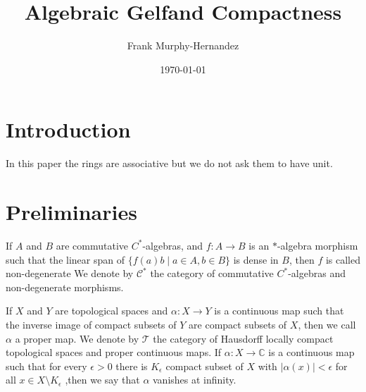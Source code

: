 \documentclass{amsart}
\begin{document}
\title{Algebraic Gelfand Compactness}

\author{Frank Murphy-Hernandez}
\address{Facultad de Ciencias, UNAM, Mexico City}


\date{\today}

\keywords{,,}

\begin{abstract}

\end{abstract}

\maketitle

\section*{Introduction}

In this paper the rings are associative but we do not ask them to have unit.



\section{Preliminaries}

\cite{wisbauer2018foundations}

If $A$ and $B$ are commutative $C^*$-algebras, and $f\colon A\longrightarrow B$ is an $*$-algebra morphism such that the linear span of $\{f(a)b\mid a\in A,b\in B\}$ is dense in $B$, then $f$ is called non-degenerate   We denote by $\mathcal{C}^*$ the category of commutative $C^*$-algebras and non-degenerate morphisms. 

If $X$ and $Y$ are topological spaces and $\alpha\colon X\longrightarrow Y$ is a continuous map such that the inverse image of compact subsets of $Y$ are compact subsets of $X$, then we call $\alpha$ a proper map.  We denote by $\mathcal{T}$ the category of Hausdorff locally compact topological spaces and proper continuous maps. If $\alpha\colon X\longrightarrow\mathbb{C}$ is a continuous map such that for every $\epsilon>0$ there is $K_\epsilon$ compact subset of $X$ with $\vert \alpha(x)\vert<\epsilon$ for all $x\in X\setminus K_\epsilon$ ,then we say that $\alpha$ vanishes at infinity.
\end{document}
